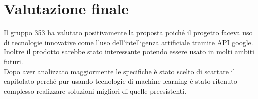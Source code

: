 \documentclass[main.tex]{subfiles}
\begin{document}
\section{Valutazione finale}
Il gruppo 353 ha valutato positivamente la proposta poiché il progetto faceva uso di tecnologie innovative come l'uso dell'intelligenza artificiale tramite API google.
Inoltre il prodotto sarebbe stato interessante potendo essere usato in molti ambiti futuri.\\
Dopo aver analizzato maggiormente le specifiche è stato scelto di scartare il capitolato perché pur usando tecnologie di machine learning  è stato ritenuto complesso realizzare soluzioni migliori di quelle preesistenti.
\end{document}
